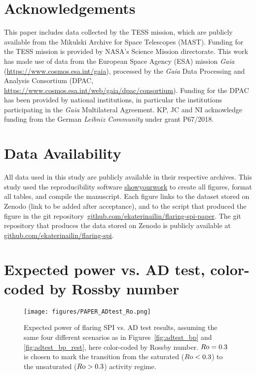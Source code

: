 \documentclass[twocolumn]{aastex631}
\begin{document}
\section*{Acknowledgements}

This paper includes data collected by the TESS mission, which are publicly available from the Mikulski Archive for Space Telescopes (MAST).
Funding for the TESS mission is provided by NASA’s Science Mission directorate. 
This work has made use of data from the European Space Agency (ESA) mission {\it Gaia} (\url{https://www.cosmos.esa.int/gaia}), processed by the {\it Gaia} Data Processing and Analysis Consortium (DPAC, \url{https://www.cosmos.esa.int/web/gaia/dpac/consortium}). Funding for the DPAC
has been provided by national institutions, in particular the institutions participating in the {\it Gaia} Multilateral Agreement.
KP, JC and NI acknowledge funding from the German \textit{Leibniz Community} under grant P67/2018.
\section*{Data Availability}
All data used in this study are publicly available in their respective archives.
This study used the reproducibility software \href{https://github.com/showyourwork/showyourwork}{showyourwork}
\citep{luger2021mappinga} to create all figures, format all tables, and compile the manuscript. Each figure links to the dataset stored on Zenodo (link to be added after acceptance), and to the script that produced the figure in the git repository~\href{https://github.com/ekaterinailin/flaring-spi-paper}{github.com/ekaterinailin/flaring-spi-paper}. The git repository that produces the data stored on Zenodo is publicly available at \href{https://github.com/ekaterinailin/flaring-spi}{github.com/ekaterinailin/flaring-spi}. 


\appendix


\section{Expected power vs. AD test, color-coded by Rossby number}
\begin{figure*}[ht!]
    \begin{centering}
        \texttt{[image: figures/PAPER\_ADtest\_Ro.png]}
        \caption{
        Expected power of flaring SPI vs. AD test results, assuming the same four different scenarios as in Figures~\ref{fig:adtest_bp} and \ref{fig:adtest_bp_rest}, here color-coded by Rossby number. $R\rm o=0.3$ is chosen to mark the transition from the saturated ($R\rm o < 0.3$) to the unsaturated ($R\rm o > 0.3$) activity regime. 
        }
        \label{fig:adtest_ro}
    \end{centering}
\end{figure*}
\end{document}
